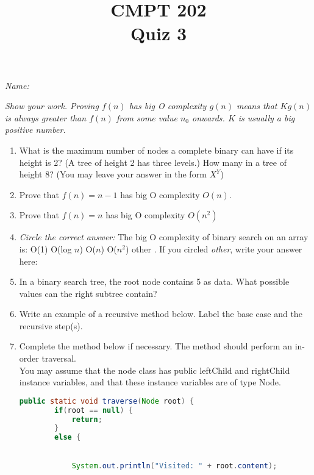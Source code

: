 \documentclass{article}
\title{CMPT 202\\Quiz 3}
\begin{document}
\maketitle
\emph{Name:}

\emph{Show your work. Proving $f(n)$ has big O complexity $g(n)$ means that
$Kg(n)$ is always greater than $f(n)$ from some value $n_0$ onwards. $K$ is
usually a big positive number.}

\begin{enumerate}
	\item What is the maximum number of nodes a complete binary can have if
	its height is 2? (A tree of height 2 has three levels.) How many in a
	tree of height 8? (You may leave your answer in the form $X^Y$)
	\vspace{1in}
	\item Prove that $f(n) = n - 1$ has big O complexity $O(n)$.
	\vspace{1in}
	\item Prove that $f(n) = n$ has big O complexity $O(n^2)$
	\vspace{1in}
	\item \emph{Circle the correct answer: }The big O complexity of binary
	search on an array is: \hspace{0.3in} O(1) \hspace{0.3in} O(log $n$) \hspace{0.3in}
	O($n$) \hspace{0.3in} O($n^2$) \hspace{0.3in} other . If you circled
	\emph{other}, write your answer here:
	\item In a binary search tree, the root node contains 5 as data. What
	possible values can the right subtree contain?
	\vspace{1in}
	\item Write an example of a recursive method below. Label the base case
	and the recursive step(s).
	\vspace{1in}
	\item Complete the method below if necessary. The method should perform
	an in-order traversal. \\
	You may assume that the node class has public
	leftChild and rightChild instance variables, and that these instance
	variables are of type Node.
	\begin{lstlisting}[language=Java]
	public static void traverse(Node root) {
		if(root == null) {
			return;
		}
		else {
			

			System.out.println("Visited: " + root.content);



\end{lstlisting}
\end{enumerate}
\end{document}
